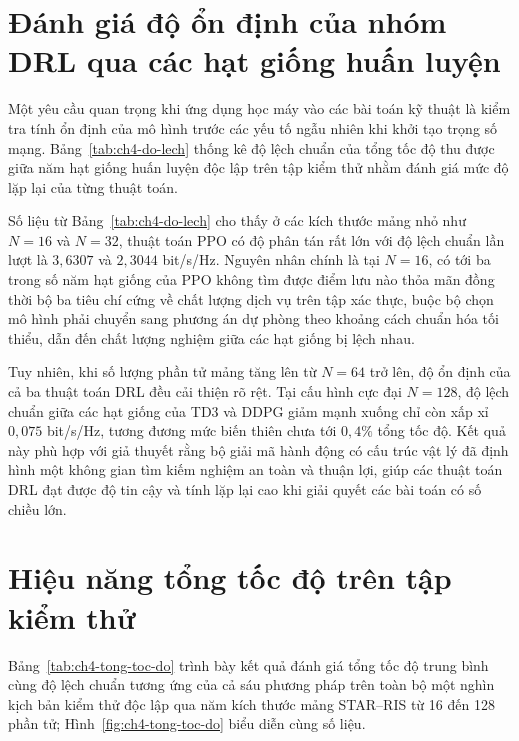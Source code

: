 \section{Đánh giá độ ổn định của nhóm DRL qua các hạt giống huấn luyện}
\label{sec:do-on-dinh}

Một yêu cầu quan trọng khi ứng dụng học máy vào các bài toán kỹ thuật là kiểm tra tính ổn định của mô hình trước
các yếu tố ngẫu nhiên khi khởi tạo trọng số mạng. Bảng~\ref{tab:ch4-do-lech} thống kê độ lệch chuẩn của tổng tốc
độ thu được giữa năm hạt giống huấn luyện độc lập trên tập kiểm thử nhằm đánh giá mức độ lặp lại của từng thuật
toán.



Số liệu từ Bảng~\ref{tab:ch4-do-lech} cho thấy ở các kích thước mảng nhỏ như $N = 16$ và $N = 32$, thuật toán PPO
có độ phân tán rất lớn với độ lệch chuẩn lần lượt là $3,6307$ và $2,3044$ bit/s/Hz. Nguyên nhân chính là tại
$N = 16$, có tới ba trong số năm hạt giống của PPO không tìm được điểm lưu nào thỏa mãn đồng thời bộ ba tiêu chí
cứng về chất lượng dịch vụ trên tập xác thực, buộc bộ chọn mô hình phải chuyển sang phương án dự phòng theo khoảng
cách chuẩn hóa tối thiểu, dẫn đến chất lượng nghiệm giữa các hạt giống bị lệch nhau.

Tuy nhiên, khi số lượng phần tử mảng tăng lên từ $N = 64$ trở lên, độ ổn định của cả ba thuật toán DRL đều cải
thiện rõ rệt. Tại cấu hình cực đại $N = 128$, độ lệch chuẩn giữa các hạt giống của TD3 và DDPG giảm mạnh xuống chỉ
còn xấp xỉ $0,075$ bit/s/Hz, tương đương mức biến thiên chưa tới $0,4\%$ tổng tốc độ. Kết quả này phù hợp với giả
thuyết rằng bộ giải mã hành động có cấu trúc vật lý đã định hình một không gian tìm kiếm nghiệm an toàn và thuận
lợi, giúp các thuật toán DRL đạt được độ tin cậy và tính lặp lại cao khi giải quyết các bài toán có số chiều lớn.

\section{Hiệu năng tổng tốc độ trên tập kiểm thử}
\label{sec:hieu-nang-tong-toc-do}

Bảng~\ref{tab:ch4-tong-toc-do} trình bày kết quả đánh giá tổng tốc độ trung bình cùng độ lệch chuẩn tương ứng của
cả sáu phương pháp trên toàn bộ một nghìn kịch bản kiểm thử độc lập qua năm kích thước mảng STAR--RIS từ 16 đến 128
phần tử; Hình~\ref{fig:ch4-tong-toc-do} biểu diễn cùng số liệu.



